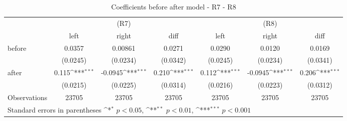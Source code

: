 \begin{table}[!ht]\centering \footnotesize
\def\sym#1{\ifmmode^{#1}\else\(^{#1}\)\fi}
\caption{Coefficients before after model - R7 - R8}
\begin{tabular}{l*{6}{c}}
\hline\hline
                     &\multicolumn{3}{c}{(R7)}&\multicolumn{3}{c}{(R8)}\\
 &\multicolumn{1}{c}{left}&\multicolumn{1}{c}{right}&\multicolumn{1}{c}{diff}&\multicolumn{1}{c}{left}&\multicolumn{1}{c}{right}&\multicolumn{1}{c}{diff}\\
 \hline
before              &      0.0357         &     0.00861         &      0.0271         &      0.0290         &      0.0120         &      0.0169         \\
                    &    (0.0245)         &    (0.0234)         &    (0.0342)         &    (0.0245)         &    (0.0234)         &    (0.0341)         \\
[0.5em]
after               &       0.115\sym{***}&     -0.0945\sym{***}&       0.210\sym{***}&       0.112\sym{***}&     -0.0945\sym{***}&       0.206\sym{***}\\
                    &    (0.0215)         &    (0.0225)         &    (0.0314)         &    (0.0216)         &    (0.0223)         &    (0.0312)         \\
\hline
Observations        &       23705         &       23705         &       23705         &       23705         &       23705         &       23705         \\
\hline\hline
\multicolumn{7}{l}{ Standard errors in parentheses \sym{*} \(p<0.05\), \sym{**} \(p<0.01\), \sym{***} \(p<0.001\)}\\
\end{tabular}
\end{table}
